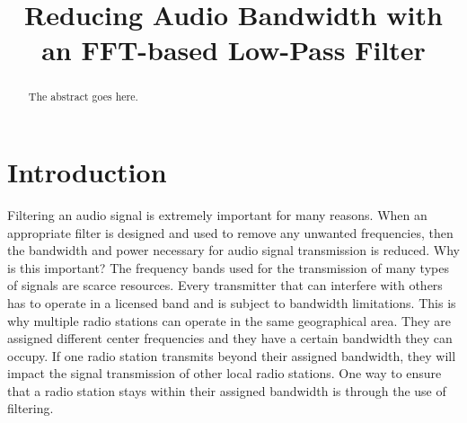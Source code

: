 
\usepackage{graphicx} %
\usepackage{hyperref}
\usepackage{amsmath}
\usepackage{float}
\usepackage{listings} %
 
\title{Reducing Audio Bandwidth with an FFT-based Low-Pass Filter}

\author{
    \and
    \and
}

\maketitle

\begin{abstract}
The abstract goes here.
\end{abstract}

\IEEEpeerreviewmaketitle

\section{Introduction} 

Filtering an audio signal is extremely important for many
reasons. When an appropriate filter is designed and used to
remove any unwanted frequencies, then the bandwidth and power
necessary for audio signal transmission is reduced. Why is this
important? The frequency bands used for the transmission of many
types of signals are scarce resources. Every transmitter that can
interfere with others has to operate in a licensed band and is
subject to bandwidth limitations. This is why multiple radio
stations can operate in the same geographical area. They are
assigned different center frequencies and they have a certain
bandwidth they can occupy. If one radio station transmits beyond
their assigned bandwidth, they will impact the signal
transmission of other local radio stations. One way to ensure
that a radio station stays within their assigned bandwidth is
through the use of filtering.\cite{notes:class}  

